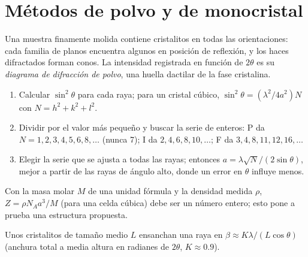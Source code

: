\section{Métodos de polvo y de monocristal}

\begin{definition}\label{def:b3:x-ray-diffraction:powder}
Una muestra finamente molida contiene cristalitos en todas las orientaciones: cada
familia de planos encuentra algunos en posición de reflexión, y los haces difractados
forman conos. La intensidad registrada en función de $2\theta$ es su \emph{diagrama
de difracción de polvo}, una huella dactilar de la
fase cristalina.
\end{definition}

\begin{method}\label{met:b3:x-ray-diffraction:index-cubic}
\begin{enumerate}
  \item Calcular $\sin^2\theta$ para cada raya; para un cristal cúbico, $\sin^2\theta =
        (\lambda^2/4a^2)N$ con $N = h^2 + k^2 + l^2$.
  \item Dividir por el valor más pequeño y buscar la serie de enteros: P da
        $N = 1, 2, 3, 4, 5, 6, 8, \dots$ (nunca 7); I da $2, 4, 6, 8, 10, \dots$; F da
        $3, 4, 8, 11, 12, 16, \dots$
  \item Elegir la serie que se ajusta a todas las rayas; entonces $a = \lambda\sqrt N/(2\sin\theta)$, mejor
        a partir de las rayas de ángulo alto, donde un error en $\theta$ influye menos.
\end{enumerate}
\end{method}

\begin{method}\label{met:b3:x-ray-diffraction:z-from-density}
Con la masa molar $M$ de una unidad fórmula y la densidad medida $\rho$, $Z =
\rho N_Aa^3/M$ (para una celda cúbica) debe ser un número entero; esto pone a prueba una
estructura propuesta.
\end{method}

\begin{proposition}\label{prop:b3:x-ray-diffraction:scherrer}
Unos cristalitos de tamaño medio $L$ ensanchan una raya en $\beta \approx K\lambda/(L\cos\theta)$ (anchura
total a media altura en radianes de $2\theta$, $K \approx 0.9$).
\end{proposition}
\admitted

